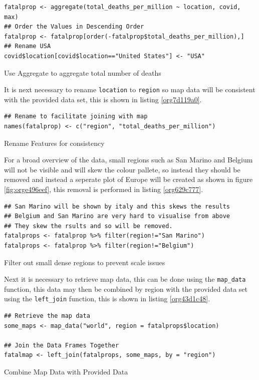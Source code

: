 \documentclass[11pt]{article}
\begin{document}
\begin{listing}[htbp]
\begin{verbatim}
fatalprop <- aggregate(total_deaths_per_million ~ location, covid, max)
## Order the Values in Descending Order
fatalprop <- fatalprop[order(-fatalprop$total_deaths_per_million),]
## Rename USA
covid$location[covid$location=="United States"] <- "USA"
\end{verbatim}
\caption{\label{org3b024e3}Use Aggregate to aggregate total number of deaths}
\end{listing}


It is next necessary to rename \texttt{location} to \texttt{region} so map data will be
consistent with the provided data set, this is shown in listing \ref{org7d119a0}.

\begin{listing}[htbp]
\begin{verbatim}
## Rename to facilitate joining with map
names(fatalprop) <- c("region", "total_deaths_per_million")
\end{verbatim}
\caption{\label{org7d119a0}Rename Features for consistency}
\end{listing}

For a broad overview of the data, small regions such as San Marino and Belgium
will not be visible and will skew the colour pallete, so instead they should be removed
and instead a seperate plot of Europe will be created as shown in figure \ref{fig:orge496eef}, this removal is performed in
listing \ref{org629c777}.

\begin{listing}[htbp]
\begin{verbatim}
## San Marino will be shown by italy and this skews the results
## Belgium and San Marino are very hard to visualise from above
## They skew the rsults and so will be removed.
fatalprops <- fatalprop %>% filter(region!="San Marino")
fatalprops <- fatalprop %>% filter(region!="Belgium")
\end{verbatim}
\caption{\label{org629c777}Filter out small dense regions to prevent scale issues}
\end{listing}


Next it is necessary to retrieve map data, this can be done using the \texttt{map\_data}
function, this data may then be combined by region with the provided data set
using the \texttt{left\_join} function, this is shown in listing \ref{org43d1c48}.

\begin{listing}[htbp]
\begin{verbatim}
## Retrieve the map data
some_maps <- map_data("world", region = fatalprops$location)

## Join the Data Frames Together
fatalmap <- left_join(fatalprops, some_maps, by = "region")
\end{verbatim}
\caption{\label{org43d1c48}Combine Map Data with Provided Data}
\end{listing}
\end{document}

